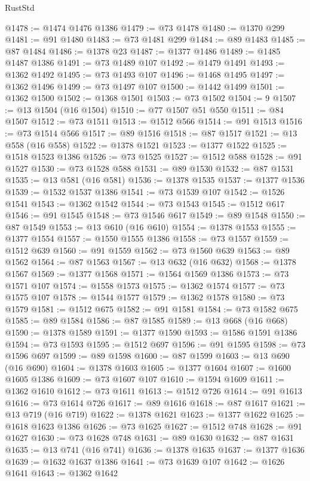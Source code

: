 \begin{lexlean}{RustStd}
\begin{coremodule}
{\begin{coremodule}
{{{{{@1478 := @1474 @1476 @1386
@1479 := @73 @1478
@1480 := @1370 @299
@1481 := @91 @1480
@1483 := @73 @1481 @299
@1484 := @89 @1483
@1485 := @87 @1484
@1486 := @1378 @23
@1487 := @1377 @1486
@1489 := @1485 @1487 @1386
@1491 := @73 @1489 @107
@1492 := @1479 @1491
@1493 := @1362 @1492
@1495 := @73 @1493 @107
@1496 := @1468 @1495
@1497 := @1362 @1496
@1499 := @73 @1497 @107
@1500 := @1442 @1499
@1501 := @1362 @1500
@1502 := @1368 @1501
@1503 := @73 @1502
@1504 := 9
@1507 := @13 @1504 (@16 @1504)
@1510 := @77 @1507 @51 @550
@1511 := @84 @1507
@1512 := @73 @1511
@1513 := @1512 @566
@1514 := @91 @1513
@1516 := @73 @1514 @566
@1517 := @89 @1516
@1518 := @87 @1517
@1521 := @13 @558 (@16 @558)
@1522 := @1378 @1521
@1523 := @1377 @1522
@1525 := @1518 @1523 @1386
@1526 := @73 @1525
@1527 := @1512 @588
@1528 := @91 @1527
@1530 := @73 @1528 @588
@1531 := @89 @1530
@1532 := @87 @1531
@1535 := @13 @581 (@16 @581)
@1536 := @1378 @1535
@1537 := @1377 @1536
@1539 := @1532 @1537 @1386
@1541 := @73 @1539 @107
@1542 := @1526 @1541
@1543 := @1362 @1542
@1544 := @73 @1543
@1545 := @1512 @617
@1546 := @91 @1545
@1548 := @73 @1546 @617
@1549 := @89 @1548
@1550 := @87 @1549
@1553 := @13 @610 (@16 @610)
@1554 := @1378 @1553
@1555 := @1377 @1554
@1557 := @1550 @1555 @1386
@1558 := @73 @1557
@1559 := @1512 @639
@1560 := @91 @1559
@1562 := @73 @1560 @639
@1563 := @89 @1562
@1564 := @87 @1563
@1567 := @13 @632 (@16 @632)
@1568 := @1378 @1567
@1569 := @1377 @1568
@1571 := @1564 @1569 @1386
@1573 := @73 @1571 @107
@1574 := @1558 @1573
@1575 := @1362 @1574
@1577 := @73 @1575 @107
@1578 := @1544 @1577
@1579 := @1362 @1578
@1580 := @73 @1579
@1581 := @1512 @675
@1582 := @91 @1581
@1584 := @73 @1582 @675
@1585 := @89 @1584
@1586 := @87 @1585
@1589 := @13 @668 (@16 @668)
@1590 := @1378 @1589
@1591 := @1377 @1590
@1593 := @1586 @1591 @1386
@1594 := @73 @1593
@1595 := @1512 @697
@1596 := @91 @1595
@1598 := @73 @1596 @697
@1599 := @89 @1598
@1600 := @87 @1599
@1603 := @13 @690 (@16 @690)
@1604 := @1378 @1603
@1605 := @1377 @1604
@1607 := @1600 @1605 @1386
@1609 := @73 @1607 @107
@1610 := @1594 @1609
@1611 := @1362 @1610
@1612 := @73 @1611
@1613 := @1512 @726
@1614 := @91 @1613
@1616 := @73 @1614 @726
@1617 := @89 @1616
@1618 := @87 @1617
@1621 := @13 @719 (@16 @719)
@1622 := @1378 @1621
@1623 := @1377 @1622
@1625 := @1618 @1623 @1386
@1626 := @73 @1625
@1627 := @1512 @748
@1628 := @91 @1627
@1630 := @73 @1628 @748
@1631 := @89 @1630
@1632 := @87 @1631
@1635 := @13 @741 (@16 @741)
@1636 := @1378 @1635
@1637 := @1377 @1636
@1639 := @1632 @1637 @1386
@1641 := @73 @1639 @107
@1642 := @1626 @1641
@1643 := @1362 @1642
}}}}}
\end{coremodule}}
\end{coremodule}
\end{lexlean}
